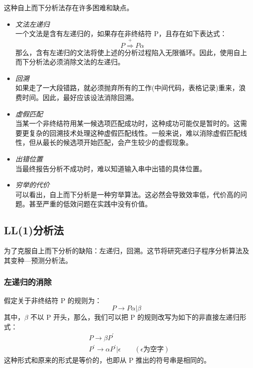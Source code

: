 这种自上而下分析法存在许多困难和缺点。
\begin{itemize}
    \item \textit{文法左递归} \\
    一个文法是含有左递归的，如果存在非终结符 P，且存在如下表达式：
    \[P \stackrel{+}{\Rightarrow} P \alpha \]
    那么，含有左递归的文法将使上述的分析过程陷入无限循环。因此，使用自上而下分析法必须消除文法的左递归。
    \item \textit{回溯} \\
    如果走了一大段错路，就必须抛弃所有的工作(中间代码，表格记录)重来，浪费时间。因此，最好应该设法消除回溯。
    \item \textit{虚假匹配} \\
    当某一个非终结符用某一候选项匹配成功时，这种成功可能仅是暂时的。这需要更复杂的回溯技术处理这种虚假匹配线性。一般来说，难以消除虚假匹配线性，但从最长的候选项开始匹配，会产生较少的虚假现象。
    \item \textit{出错位置} \\
    当最终报告分析不成功时，难以知道输入串中出错的具体位置。
    \item \textit{穷举的代价} \\
    可以看出，自上而下分析是一种穷举算法。这必然会导致效率低，代价高的问题。甚至严重的低效问题在实践中没有价值。
\end{itemize}

\subsection{LL(1)分析法}

为了克服自上而下分析的缺陷：左递归，回溯。这节将研究递归子程序分析算法及其变种—预测分析法。

\subsubsection{左递归的消除}

假定关于非终结符 P 的规则为：
\[ P \rightarrow P\alpha|\beta \]
其中，$\beta$ 不以 P 开头，那么，我们可以把 P 的规则改写为如下的非直接左递归形式：
\begin{equation}
    \begin{aligned}
        &P \rightarrow \beta P^{'} \\
        &P^{'} \rightarrow \alpha P^{'} | \epsilon \qquad (\epsilon \text{为空字})  \nonumber
    \end{aligned}
\end{equation}
这种形式和原来的形式是等价的，也即从 P 推出的符号串是相同的。

